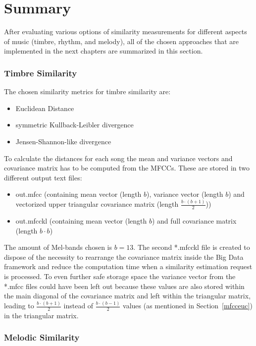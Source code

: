 \section{Summary}\label{sumfeat}

After evaluating various options of similarity measurements for different aspects of music (timbre, rhythm, and melody), all of the chosen approaches that are implemented in the next chapters are summarized in this section. 

\subsubsection{Timbre Similarity}

The chosen similarity metrics for timbre similarity are: 
\begin{itemize}
	\setlength\itemsep{-0.5em}
	\item Euclidean Distance
	\item symmetric Kullback-Leibler divergence
	\item Jensen-Shannon-like divergence
\end{itemize}
To calculate the distances for each song the mean and variance vectors and covariance matrix has to be computed from the MFCCs. These are stored in two different output text files: 
\begin{itemize}
	\setlength\itemsep{-0.5em}
	\item out.mfcc (containing mean vector (length $b$), variance vector (length $b$) and vectorized upper triangular covariance matrix (length $\frac{b \cdot (b+1)}{2}$))
	\item out.mfcckl (containing mean vector (length $b$) and full covariance matrix (length $b \cdot b$)
\end{itemize}
The amount of Mel-bands chosen is $b = 13$. The second *.mfcckl file is created to dispose of the necessity to rearrange the covariance matrix inside the Big Data framework and reduce the computation time when a similarity estimation request is processed. To even further safe storage space the variance vector from the *.mfcc files could have been left out because these values are also stored within the main diagonal of the covariance matrix and left within the triangular matrix, leading to $\frac{b \cdot (b+1)}{2}$ instead of $\frac{b \cdot (b-1)}{2}$ values (as mentioned in Section~\ref{mfcceuc}) in the triangular matrix.\\

\subsubsection{Melodic Similarity}

